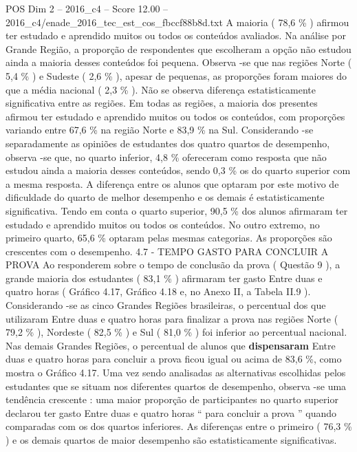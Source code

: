 \begin{textsample}{POS Dim 2 – 2016\_c4 – Score 12.00 – 2016\_c4/enade\_2016\_tec\_est\_cos\_fbccf88b8d.txt}
A maioria ( 78,6 \% ) afirmou ter estudado e aprendido muitos ou todos os conteúdos avaliados.
Na análise por Grande Região, a proporção de respondentes que escolheram a opção não estudou ainda a maioria desses conteúdos foi pequena.
Observa -se que nas regiões Norte ( 5,4 \% ) e Sudeste ( 2,6 \% ), apesar de pequenas, as proporções foram maiores do que a média nacional ( 2,3 \% ).
Não se observa diferença estatisticamente significativa entre as regiões.
Em todas as regiões, a maioria dos presentes afirmou ter estudado e aprendido muitos ou todos os conteúdos, com proporções variando entre 67,6 \% na região Norte e 83,9 \% na Sul.
Considerando -se separadamente as opiniões de estudantes dos quatro quartos de desempenho, observa -se que, no quarto inferior, 4,8 \% ofereceram como resposta que não estudou ainda a maioria desses conteúdos, sendo 0,3 \% os do quarto superior com a mesma resposta.
A diferença entre os alunos que optaram por este motivo de dificuldade do quarto de melhor desempenho e os demais é estatisticamente significativa.
Tendo em conta o quarto superior, 90,5 \% dos alunos afirmaram ter estudado e aprendido muitos ou todos os conteúdos.
No outro extremo, no primeiro quarto, 65,6 \% optaram pelas mesmas categorias.
As proporções são crescentes com o desempenho. 4.7 - TEMPO GASTO PARA CONCLUIR A PROVA Ao responderem sobre o tempo de conclusão da prova ( Questão 9 ), a grande maioria dos estudantes ( 83,1 \% ) afirmaram ter gasto Entre duas e quatro horas ( Gráfico 4.17, Gráfico 4.18 e, no Anexo II, a Tabela II.9 ).
Considerando -se as cinco Grandes Regiões brasileiras, o percentual dos que utilizaram Entre duas e quatro horas para finalizar a prova nas regiões Norte ( 79,2 \% ), Nordeste ( 82,5 \% ) e Sul ( 81,0 \% ) foi inferior ao percentual nacional.
Nas demais Grandes Regiões, o percentual de alunos que \textbf{dispensaram} Entre duas e quatro horas para concluir a prova ficou igual ou acima de 83,6 \%, como mostra o Gráfico 4.17.
Uma vez sendo analisadas as alternativas escolhidas pelos estudantes que se situam nos diferentes quartos de desempenho, observa -se uma tendência crescente : uma maior proporção de participantes no quarto superior declarou ter gasto Entre duas e quatro horas “ para concluir a prova ” quando comparadas com os dos quartos inferiores.
As diferenças entre o primeiro ( 76,3 \% ) e os demais quartos de maior desempenho são estatisticamente significativas.

\end{textsample}
